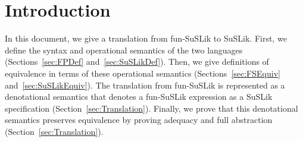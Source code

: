 \documentclass[10pt]{article}
\newcommand{\sem} [1] {\llbracket#1\rrbracket}
\newcommand{\Gsem} [1] {\mathcal{G}\sem{#1}}
\newcommand{\Ssem} [1] {\mathcal{S}\sem{#1}}
\begin{document}
\section{Introduction}

In this document, we give a translation from fun-SuSLik to SuSLik. First, we define the syntax and
operational semantics of the two languages (Sections~\ref{sec:FPDef} and~\ref{sec:SuSLikDef}).
Then, we give definitions of equivalence in terms of these
operational semantics (Sections~\ref{sec:FSEquiv} and~\ref{sec:SuSLikEquiv}). The translation from fun-SuSLik is represented as a denotational semantics
that denotes a fun-SuSLik expression as a SuSLik specification (Section~\ref{sec:Translation}). Finally, we prove that this denotational
semantics preserves equivalence by proving adequacy and full abstraction (Section~\ref{sec:Translation}).


%
%
%
%
%
%
%
\end{document}
